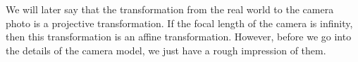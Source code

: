 We will later say that the transformation from the real world to the camera photo is a projective transformation. If the focal length of the camera is infinity, then this transformation is an affine transformation. However, before we go into the details of the camera model, we just have a rough impression of them.
